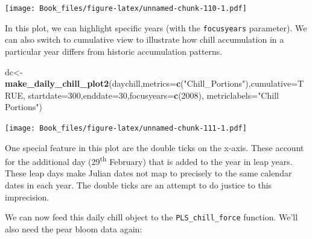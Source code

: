 \documentclass[
]{book}
\newenvironment{Shaded}{\begin{snugshade}}{\end{snugshade}}
\newcommand{\DataTypeTok}[1]{\textcolor[rgb]{0.13,0.29,0.53}{#1}}
\newcommand{\DecValTok}[1]{\textcolor[rgb]{0.00,0.00,0.81}{#1}}
\newcommand{\KeywordTok}[1]{\textcolor[rgb]{0.13,0.29,0.53}{\textbf{#1}}}
\newcommand{\NormalTok}[1]{#1}
\newcommand{\OtherTok}[1]{\textcolor[rgb]{0.56,0.35,0.01}{#1}}
\newcommand{\StringTok}[1]{\textcolor[rgb]{0.31,0.60,0.02}{#1}}
\begin{document}
\texttt{[image: Book\_files/figure-latex/unnamed-chunk-110-1.pdf]}

In this plot, we can highlight specific years (with the \texttt{focusyears} parameter). We can also switch to cumulative view to illustrate how chill accumulation in a particular year differs from historic accumulation patterns.

\begin{Shaded}
\begin{Highlighting}[]
\NormalTok{dc<-}\KeywordTok{make_daily_chill_plot2}\NormalTok{(daychill,}\DataTypeTok{metrics=}\KeywordTok{c}\NormalTok{(}\StringTok{"Chill_Portions"}\NormalTok{),}\DataTypeTok{cumulative=}\OtherTok{TRUE}\NormalTok{,}
   \DataTypeTok{startdate=}\DecValTok{300}\NormalTok{,}\DataTypeTok{enddate=}\DecValTok{30}\NormalTok{,}\DataTypeTok{focusyears=}\KeywordTok{c}\NormalTok{(}\DecValTok{2008}\NormalTok{), }\DataTypeTok{metriclabels=}\StringTok{"Chill Portions"}\NormalTok{)}
\end{Highlighting}
\end{Shaded}

\texttt{[image: Book\_files/figure-latex/unnamed-chunk-111-1.pdf]}

One special feature in this plot are the double ticks on the x-axis. These account for the additional day (29\textsuperscript{th} February) that is added to the year in leap years. These leap days make Julian dates not map to precisely to the same calendar dates in each year. The double ticks are an attempt to do justice to this imprecision.

We can now feed this daily chill object to the \texttt{PLS\_chill\_force} function. We'll also need the pear bloom data again:
\end{document}
